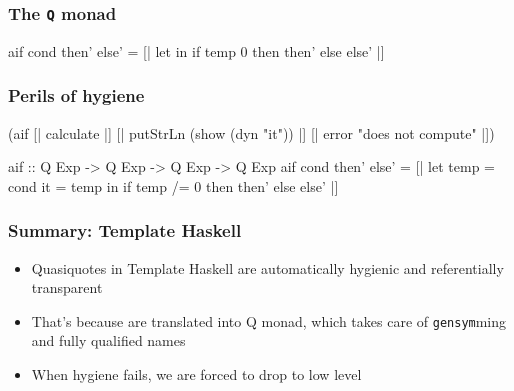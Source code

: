 \documentclass[hyperref={bookmarks=false}]{beamer}
\begin{document}
\begin{frame}[fragile]
\frametitle{The \texttt{Q} monad}
\begin{semiverbatim}
aif cond then' else' =
  [| let 
     in if temp  0 then {\textdollar}then' else {\textdollar}else' |]

          \visible<2>{(LetE [ValD (VarP temp) (NormalB cond) [],}
                 \visible<2>{ValD (VarP it) (NormalB (VarE temp)) []]}

\end{semiverbatim}
\end{frame}

\begin{frame}[fragile]
\frametitle{Perils of hygiene}
\begin{semiverbatim}
{\textdollar}(aif [| calculate |]
  [| putStrLn (show \alert{{\textdollar}(dyn "it")}) |]
  [| error "does not compute" |])

aif :: Q Exp -> Q Exp -> Q Exp -> Q Exp
aif cond then' else' =
  [| let temp = {\textdollar}cond
         it = temp
     in if temp /= 0 then {\textdollar}then' else {\textdollar}else' |]
\end{semiverbatim}
\end{frame}

\begin{frame}[fragile]
\frametitle{Summary: Template Haskell}
\begin{itemize}
\item Quasiquotes in Template Haskell are automatically hygienic and referentially transparent
\item That's because are translated into Q monad, which takes care of \texttt{gensym}ming and fully qualified names
\item When hygiene fails, we are forced to drop to low level
\end{itemize}
\end{frame}
\end{document}
